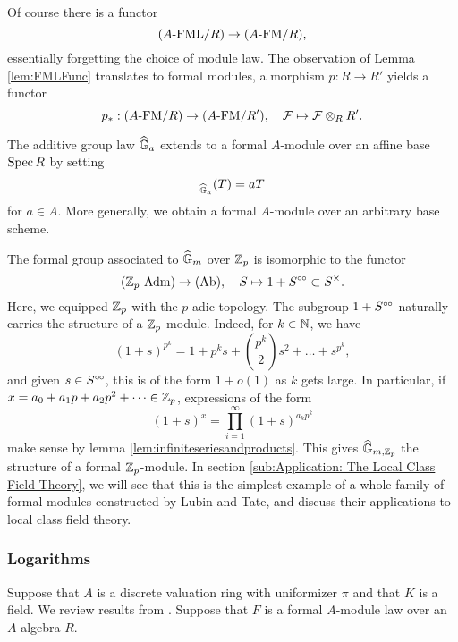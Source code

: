 Of course there is a functor 
\begin{equation*}
  {({A}\text-\mathrm{FML}/{R})} \to {({A}\text-\mathrm{FM}/{R})},
\end{equation*}
essentially forgetting the choice of module law. The observation of Lemma 
\ref{lem:FMLFunc} translates to formal modules, a morphism $p : R \to R'$ 
yields a functor 
\begin{equation*} p_*: {({A}\text-\mathrm{FM}/{R})} \to {({A}\text-\mathrm{FM}/{R'})}, \quad \mathcal{F} \mapsto \mathcal{F} \otimes_R R'.
\end{equation*}

\begin{xpl}
  The additive group law $\widehat{\mathbb{G}}_a$ extends to a formal $A$-module over an affine base
  $\operatorname{Spec} R$ by setting 
  \begin{equation*}
    [a]_{\GG_a}(T) = aT
  \end{equation*}
  for $a \in A$. More generally, we obtain a formal $A$-module over an arbitrary base
  scheme.

  The formal group associated to $\widehat{\mathbb{G}}_m$ over $\mathbb{Z}_p$ is isomorphic to the functor
  \begin{equation*}
    {({\mathbb{Z}_p}\text-\mathrm{Adm})} \to {(\mathrm{Ab})}, \quad S \mapsto 1 + S^{\circ \hspace{-0.5pt} \circ} \subset S^\times.
  \end{equation*}
  Here, we equipped $\mathbb{Z}_p$ with the $p$-adic topology.
  The subgroup $1 + S^{\circ \hspace{-0.5pt} \circ}$ naturally carries the structure of a $\mathbb{Z}_p$-module.
  Indeed, for $k \in \mathbb{N}$, we have
  \begin{equation*}
    (1+s)^{p^k} = 1 + p^ks + \binom{p^k}2 s^2 + \dots + s^{p^k},
  \end{equation*}
  and given $s \in S^{\circ \hspace{-0.5pt} \circ}$, this is of the form $1+ o(1)$ as $k$ gets large. 
  In particular, if $x = a_0 + a_1 p + a_2p^2 + \dots \in \mathbb{Z}_p$, expressions of the form
  \begin{equation*}
    (1+s)^x = \prod_{i = 1}^\infty (1+s)^{a_k p^k}
  \end{equation*}
  make sense by lemma \ref{lem:infiniteseriesandproducts}. This gives
  $\widehat{\mathbb{G}}_{m,\mathbb{Z}_p}$ the structure of a formal $\mathbb{Z}_p$-module. 
  In section \ref{sub:Application: The Local Class Field Theory}, we will see that this
  is the simplest example of a whole family of formal modules constructed by 
  Lubin and Tate, and discuss their applications to local class field theory.
\end{xpl}

\subsubsection{Logarithms} %
\label{ssub:Logarithms}
Suppose that $A$ is a discrete valuation ring with uniformizer $\pi$ and that $K$ is a 
field. We review results from \cite{hopkins1994equivariant}. 
Suppose that $F$ is a formal $A$-module law over an $A$-algebra $R$. 

